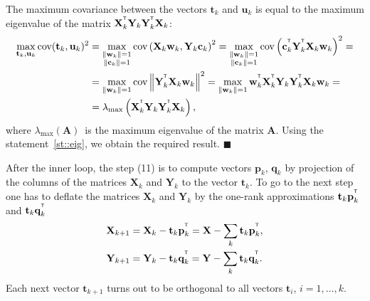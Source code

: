 \documentclass[12pt,twoside]{article}
\newcommand{\bw}{\mathbf{w}}
\newcommand{\bY}{\mathbf{Y}}
\newcommand{\bX}{\mathbf{X}}
\newcommand{\bu}{\mathbf{u}}
\newcommand{\bt}{\mathbf{t}}
\newcommand{\bp}{\mathbf{p}}
\newcommand{\bq}{\mathbf{q}}
\newcommand{\bc}{\mathbf{c}}
\newcommand{\T}{^{\text{\tiny\sffamily\upshape\mdseries T}}}
\begin{document}
The maximum covariance between the vectors $\bt_k$ and $\bu_k$ is equal to the maximum eigenvalue of the matrix $\bX_k^{\T} \bY_k \bY_k^{\T} \bX_k$:
\begin{align*}
\max_{\bt_k, \bu_k}  \text{cov} (\bt_k, \bu_k)^2 &= \max_{\substack{\|\bw_k\|=1 \\ \|\bc_k\| = 1}} \text{cov} \left( \bX_k \bw_k, \bY_k \bc_k \right)^2 = \max_{\substack{\|\bw_k\|=1 \\ \|\bc_k\| = 1}} \text{cov} \left(\bc_k^{\T}  \bY_k^{\T} \bX_k \bw_k \right)^2 = \\
&= \max_{\|\bw_k\| = 1} \text{cov} \left\|\bY_k^{\T} \bX_k \bw_k \right\|^2 = \max_{\|\bw_k\| = 1} \bw_k^{\T} \bX_k^{\T} \bY_k \bY_k^{\T} \bX_k \bw_k = \\
& = \lambda_{\max} \left( \bX_k^{\T} \bY_k \bY_k^{\T} \bX_k \right),
\end{align*}
where $ \lambda_{\max} (\mathbf{A})$~is the maximum eigenvalue of the matrix $\mathbf{A}$.
Using the statement~\ref{st::eig}, we obtain the required result.
$\blacksquare$

After the inner loop, the step (11) is to compute vectors $\bp_k$, $\bq_k$ by projection of the columns of the matrices $\bX_k$ and $\bY_k$ to the vector $\bt_k$. 
To go to the next step one has to deflate the matrices $\bX_k$ and $\bY_k$ by the one-rank approximations $\bt_k \bp_k^{\T}$ and $\bt_k \bq_k^{\T}$
\begin{align*}
    \bX_{k + 1} &= \bX_{k} - \bt_k \bp_k^{\T} = \bX - \sum_k \bt_k \bp_k^{\T}, \\
    \bY_{k + 1} &= \bY_{k} - \bt_k \bq_k^{\T} = \bY - \sum_k \bt_k \bq_k^{\T}.
\end{align*}
Each next vector $\bt_{k+1}$ turns out to be orthogonal to all vectors $\bt_i$, $i=1, \dots, k$.
\end{document}
